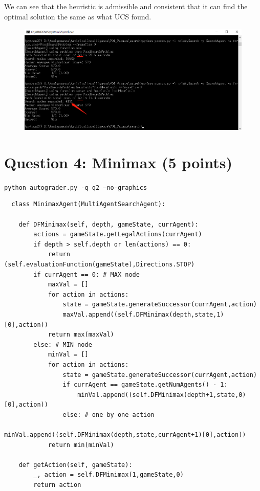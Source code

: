 \documentclass[a4paper, 11pt]{article}
\begin{document}
We can see that the heuristic is admissible and consistent that it can find the optimal solution the same as what UCS found.
\begin{figure}[H]
  \centering
  \includegraphics[width=\linewidth]{fig/Q3.png}
\end{figure}

\section{Question 4: Minimax (5 points)}
\texttt{python autograder.py -q q2 --no-graphics}
\begin{lstlisting}
  class MinimaxAgent(MultiAgentSearchAgent):

    def DFMinimax(self, depth, gameState, currAgent):
        actions = gameState.getLegalActions(currAgent)
        if depth > self.depth or len(actions) == 0:
            return (self.evaluationFunction(gameState),Directions.STOP)
        if currAgent == 0: # MAX node
            maxVal = []
            for action in actions:
                state = gameState.generateSuccessor(currAgent,action)
                maxVal.append((self.DFMinimax(depth,state,1)[0],action))
            return max(maxVal)
        else: # MIN node
            minVal = []
            for action in actions:
                state = gameState.generateSuccessor(currAgent,action)
                if currAgent == gameState.getNumAgents() - 1:
                    minVal.append((self.DFMinimax(depth+1,state,0)[0],action))
                else: # one by one action
                    minVal.append((self.DFMinimax(depth,state,currAgent+1)[0],action))
            return min(minVal)

    def getAction(self, gameState):
        _, action = self.DFMinimax(1,gameState,0)
        return action
\end{lstlisting}
\end{document}
